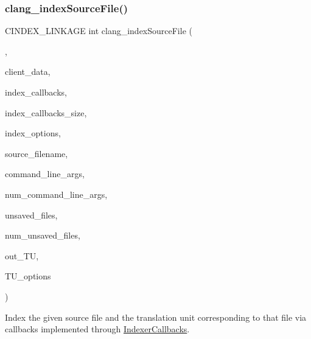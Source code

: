 \subsubsection{\texorpdfstring{clang\+\_\+index\+Source\+File()}{clang\_indexSourceFile()}}
{\footnotesize\ttfamily C\+I\+N\+D\+E\+X\+\_\+\+L\+I\+N\+K\+A\+GE int clang\+\_\+index\+Source\+File (\begin{DoxyParamCaption}\item[{\hyperlink{group__CINDEX__HIGH_gac8d30d3e3fb34d887b611e7c6de3afb6}{C\+X\+Index\+Action}}]{,  }\item[{\hyperlink{group__CINDEX_gacfa40c3de26d228c0d898403c2c21612}{C\+X\+Client\+Data}}]{client\+\_\+data,  }\item[{\hyperlink{structIndexerCallbacks}{Indexer\+Callbacks} $\ast$}]{index\+\_\+callbacks,  }\item[{unsigned}]{index\+\_\+callbacks\+\_\+size,  }\item[{unsigned}]{index\+\_\+options,  }\item[{const char $\ast$}]{source\+\_\+filename,  }\item[{const char $\ast$const $\ast$}]{command\+\_\+line\+\_\+args,  }\item[{int}]{num\+\_\+command\+\_\+line\+\_\+args,  }\item[{struct \hyperlink{structCXUnsavedFile}{C\+X\+Unsaved\+File} $\ast$}]{unsaved\+\_\+files,  }\item[{unsigned}]{num\+\_\+unsaved\+\_\+files,  }\item[{\hyperlink{group__CINDEX_gacdb7815736ca709ce9a5e1ec2b7e16ac}{C\+X\+Translation\+Unit} $\ast$}]{out\+\_\+\+TU,  }\item[{unsigned}]{T\+U\+\_\+options }\end{DoxyParamCaption})}



Index the given source file and the translation unit corresponding to that file via callbacks implemented through \hyperlink{structIndexerCallbacks}{Indexer\+Callbacks}. 


